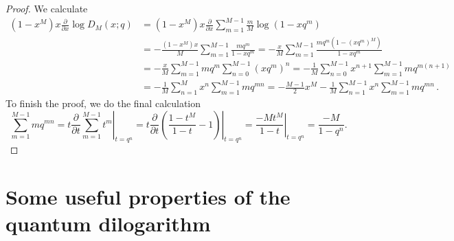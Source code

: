 \documentclass[12pt]{amsart}
\theoremstyle{definition}
\begin{document}
\begin{proof}
We calculate
\begin{align*} 
(1-x^M) x\frac{\partial}{\partial x}\log D_M(x; q)
&= (1-x^M)x\frac{\partial}{\partial x}\sum_{m=1}^{M-1}\frac mM\log(1-xq^m)\\
&= -\frac{(1-x^M)x}{M}\sum_{m=1}^{M-1}\frac{mq^m}{1-xq^m}
=-\frac{x}{M}\sum_{m=1}^{M-1}\frac{mq^m\left(1-(xq^m)^M\right)}{1-xq^m} \\
&= -\frac{x}{M}\sum_{m=1}^{M-1}mq^m\sum_{n=0}^{M-1}\left(xq^m\right)^n
=-\frac{1}{M}\sum_{n=0}^{M-1}x^{n+1} \sum_{m=1}^{M-1}mq^{m(n+1)}\\
&= -\frac{1}{M}\sum_{n=1}^{M}x^{n} \sum_{m=1}^{M-1}mq^{mn}
=-\frac{M-1}2 x^M-\frac{1}{M}\sum_{n=1}^{M-1}x^{n} \sum_{m=1}^{M-1}mq^{mn} \,.
\end{align*}
To finish the proof, we do the final calculation
\begin{equation}
\sum_{m=1}^{M-1}mq^{mn}
=\left.t\frac{\partial}{\partial t}\sum_{m=1}^{M-1}t^m\right\vert_{t=q^n}
=\left.t\frac{\partial}{\partial t}\left(\frac{1-t^M}{1-t}-1\right)
\right\vert_{t=q^n}
=\left.\frac{-Mt^M}{1-t}\right\vert_{t=q^n}=\frac{-M}{1-q^n}.
\end{equation}
\end{proof}


\appendix

\section{Some useful properties of the quantum dilogarithm}
\label{sec.QDL}
\end{document}
